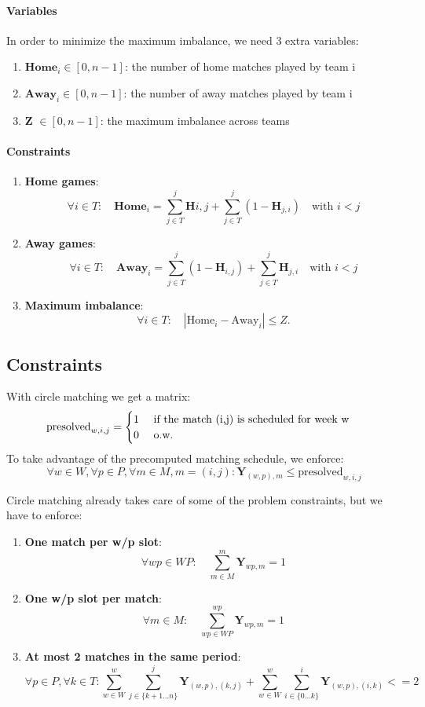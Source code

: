\paragraph{Variables}
In order to minimize the maximum imbalance, we need 3 extra variables:
\begin{enumerate}
\item $\textbf{Home}_{i} \in [0,n-1]$: the number of home matches played by team i
\item $\textbf{Away}_{i} \in [0,n-1]$: the number of away matches played by team i
\item \textbf{Z} $ \in [0,n-1]$: the maximum imbalance across teams
\end{enumerate}

\paragraph{Constraints}
\begin{enumerate}
    \item \textbf{Home games}: 
\[\forall i \in T: \quad \textbf{Home}_{i} = \sum_{j \in T}^{j} \textbf{H}{i,j} + \sum_{j \in T}^{j} (1- \textbf{H}_{j,i}) \quad \text{with $i < j$}\]
    \item \textbf{Away games}: 
\[\forall i \in T: \quad \textbf{Away}_{i} = \sum_{j \in T}^{j} (1- \textbf{H}_{i,j}) + \sum_{j \in T}^{j} \textbf{H}_{j,i} \quad \text{with $i < j$}\]
    \item \textbf{Maximum imbalance}: 
\[
\forall i \in T: \quad |\text{Home}_{i} - \text{Away}_{i}| \leq Z.
\]
\end{enumerate}

\subsection{Constraints}
With circle matching we get a matrix:
\[
\text{presolved}_{w,i,j} = 
\begin{cases}
    \text{1 \quad if the match (i,j) is scheduled for week w}\\
    \text{0 \quad o.w.}
\end{cases}
\]
To take advantage of the precomputed matching schedule, we enforce:
\[\forall w \in W, \forall p \in P, \forall m \in M, m = (i,j): \textbf{Y}_{(w,p),m} \leq \text{presolved}_{w,i,j}\]

Circle matching already takes care of some of the problem constraints, but we have to enforce:
\begin{enumerate}
\item \textbf{One match per w/p slot}: 
\[\forall wp \in WP: \quad\sum_{m \in M}^{m} \textbf{Y}_{wp, m} = 1\]
\item \textbf{One w/p slot per match}: 
\[\forall m \in M: \quad\sum_{wp \in WP}^{wp} \textbf{Y}_{wp, m} = 1\]
\item \textbf{At most 2 matches in the same period}: 
\[
\forall p \in P, \forall k \in T:
\sum_{w \in W}^{w}\sum_{j \in \{k+1\dots n\}}^{j} \textbf{Y}_{(w,p), (k,j)} + 
\sum_{w \in W}^{w}\sum_{i \in \{0\dots k\}}^{i} \textbf{Y}_{(w,p), (i,k)} <= 2
\]
\end{enumerate}

